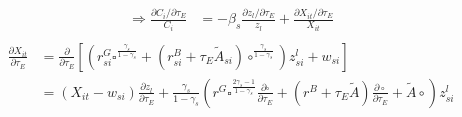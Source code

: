 \documentclass[12pt]{article} %
\begin{document}
\begin{enumerate}
\begin{equation*}
\begin{split}
            \Rightarrow \frac{\partial C_i/\partial\tau_E}{C_i} & = -\beta_s \frac{\partial z_l/\partial\tau_E}{z_l} + \frac{\partial X_{it}/\partial\tau_E }{X_{it}}\\
        \end{split}
    \end{equation*}
    \begin{equation*}
        \begin{split}
            \frac{\partial X_{it}}{\partial\tau_E } & =  \frac{\partial }{\partial\tau_E } \left[
                (r^{G}_{si}\square^{\frac{\gamma_s}{1-\gamma_s}}  + (r^{B}_{si} + \tau_{E}\tilde{A}_{si})\circ^{\frac{\gamma_s}{1-\gamma_s}} ){z_{si}^l} + w_{si} \right]\\
                & = (X_{it} - w_{si})\frac{\partial z_l}{\partial\tau_E} + {\frac{\gamma_s}{1-\gamma_s}}(r^G \square^{\frac{2\gamma_s-1}{1-\gamma_s}} \frac{\partial \square}{\partial\tau_E } + (r^B + \tau_{E}\tilde{A})\frac{\partial \circ}{\partial\tau_E } + \tilde{A}\circ){z_{si}^l} \\
        \end{split}
    \end{equation*}
 

\end{enumerate}
\end{document}
